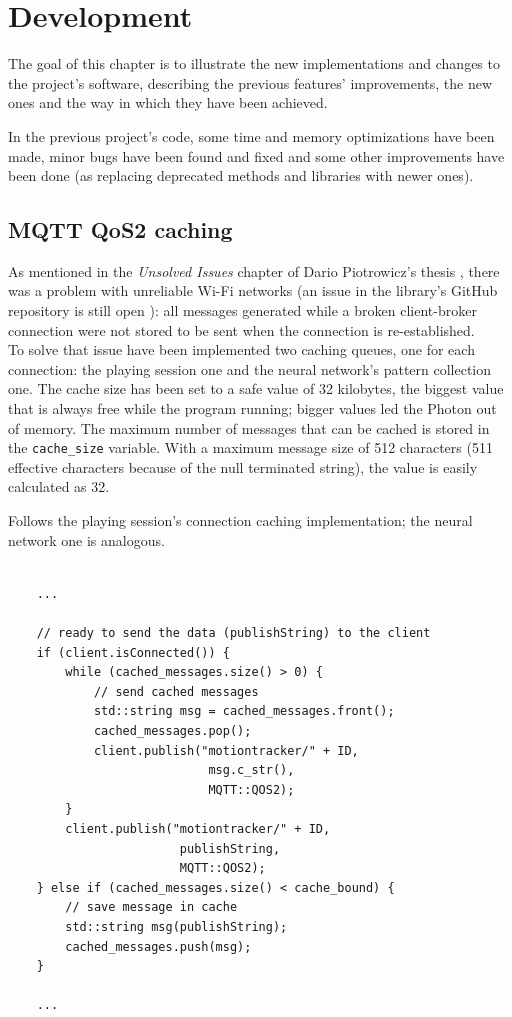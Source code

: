 \chapter{Development}
The goal of this chapter is to illustrate the new implementations and changes to the project's software, describing the previous features' improvements, the new ones and the way in which they have been achieved.
\bigbreak

In the previous project's code, some time and memory optimizations have been made, minor bugs have been found and fixed and some other improvements have been done (as replacing deprecated methods and libraries with newer ones).

\section{MQTT QoS2 caching}
As mentioned in the \textit{Unsolved Issues} chapter of Dario Piotrowicz's thesis \cite{Pio19}, there was a problem with unreliable Wi-Fi networks (an issue in the library's GitHub repository is still open \cite{githubQos2Issue}): all messages generated while a broken client-broker connection were not stored to be sent when the connection is re-established.\\
To solve that issue have been implemented two caching queues, one for each connection: the playing session one and the neural network's pattern collection one. The cache size has been set to a safe value of 32 kilobytes, the biggest value that is always free while the program running; bigger values led the Photon out of memory.
The maximum number of messages that can be cached is stored in the \texttt{cache\_size} variable. With a maximum message size of 512 characters (511 effective characters because of the null terminated string), the value is easily calculated as 32.

Follows the playing session's connection caching implementation; the neural network one is analogous.
\bigbreak

\begin{lstlisting}[style=CPPStyle]

	...

	// ready to send the data (publishString) to the client
	if (client.isConnected()) {
        while (cached_messages.size() > 0) {
			// send cached messages
            std::string msg = cached_messages.front();
            cached_messages.pop();
			client.publish("motiontracker/" + ID,
							msg.c_str(),
							MQTT::QOS2);
        }
		client.publish("motiontracker/" + ID,
						publishString,
						MQTT::QOS2);
    } else if (cached_messages.size() < cache_bound) {
		// save message in cache
        std::string msg(publishString);
        cached_messages.push(msg);
    }

	...

\end{lstlisting}
\bigbreak

